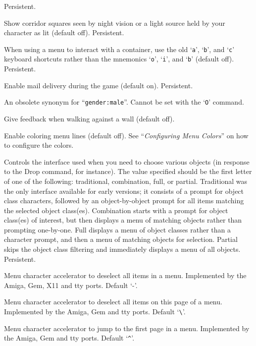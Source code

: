Persistent.
\item[\ib{lit\verb+_+corridor}]
Show corridor squares seen by night vision or a light source held by your
character as lit (default off).  Persistent.
\item[\ib{lootabc}]
When using a menu to interact with a container,
use the old `{\tt a}', `{\tt b}', and `{\tt c}' keyboard shortcuts
rather than the mnemonics `{\tt o}', `{\tt i}', and `{\tt b}' (default off).
Persistent.
\item[\ib{mail}]
Enable mail delivery during the game (default on).  Persistent.
\item[\ib{male}]
An obsolete synonym for ``{\tt gender:male}''.  Cannot be set with the
`{\tt O}' command.
\item[\ib{mention\verb+_+walls}]
Give feedback when walking against a wall (default off).
\item[\ib{menucolors}]
Enable coloring menu lines (default off).
See ``{\it Configuring Menu Colors\/}'' on how to configure the colors.
\item[\ib{menustyle}]
Controls the interface used when you need to choose various objects (in
response to the Drop command, for instance).  The value specified should
be the first letter of one of the following:  traditional, combination,
full, or partial.
Traditional was the only interface available for
early versions; it consists of a prompt for object class characters,
followed by an object-by-object prompt for all items matching the selected
object class(es).
Combination starts with a prompt for object class(es)
of interest, but then displays a menu of matching objects rather than
prompting one-by-one.
Full displays a menu of
object classes rather than a character prompt, and then a menu of matching
objects for selection.
Partial skips the object class filtering and
immediately displays a menu of all objects.
Persistent.
\item[\ib{menu\verb+_+deselect\verb+_+all}]
Menu character accelerator to deselect all items in a menu.
Implemented by the Amiga, Gem, X11 and tty ports.
Default `-'.
\item[\ib{menu\verb+_+deselect\verb+_+page}]
Menu character accelerator to deselect all items on this page of a menu.
Implemented by the Amiga, Gem and tty ports.
Default `\verb+\+'.
\item[\ib{menu\verb+_+first\verb+_+page}]
Menu character accelerator to jump to the first page in a menu.
Implemented by the Amiga, Gem and tty ports.
Default `\verb+^+'.
\item[\ib{menu\verb+_+headings}]
